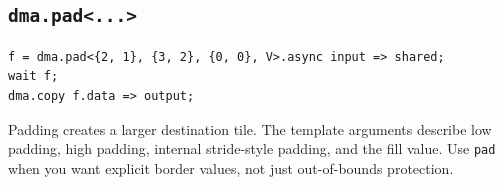 \subsection*{\texttt{dma.\allowbreak{}pad\textless{}.\allowbreak{}.\allowbreak{}.\allowbreak{}\textgreater{}}}

\begin{lstlisting}[language=croqtile,caption={dma.pad ...}]
f = dma.pad<{2, 1}, {3, 2}, {0, 0}, V>.async input => shared;
wait f;
dma.copy f.data => output;
\end{lstlisting}

Padding creates a larger destination tile. The template arguments describe low padding, high padding, internal stride-style padding, and the fill value. Use \texttt{pad} when you want explicit border values, not just out-of-bounds protection.
